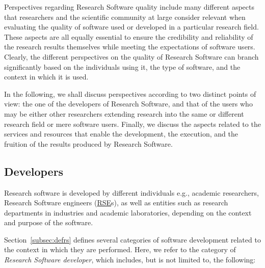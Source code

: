
Perspectives regarding Research Software quality include many different aspects that researchers and the scientific community at large consider relevant when evaluating the quality of software used or developed in a particular research field. These aspects are all equally essential to ensure the credibility and reliability of the research results themselves while meeting the expectations of software users. Clearly, the different perspectives on the quality of Research Software can branch significantly based on the individuals using it, the type of software, and the context in which it is used.

In the following, we shall discuss perspectives according to two distinct points of view: the one of the developers of Research Software, and that of the users who may be either other researchers extending research into the same or different research field or mere software users. Finally, we discuss the aspects related to the services and resources that enable the development, the execution, and the fruition of the results produced by Research Software.

\subsection{Developers}

Research software is developed by different individuals e.g., academic researchers, Research Software engineers (\href{https://society-rse.org/}{RSE}s), as well as entities such as research departments in industries and academic laboratories, depending on the context and purpose of the software.

Section~\ref{subsec:defrs} defines several categories of software development related to the context in which they are performed. Here, we refer to the category of  \textit{Research Software developer}, which includes, but is not limited to, the following:

